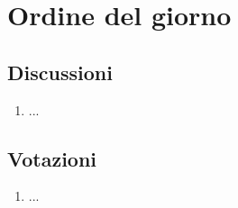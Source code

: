 \section{Ordine del giorno} \label{sec:agenda}
\subsection{Discussioni} \label{subsec:discussione}
\begin{enumerate}
    \item ... 
\end{enumerate}

\subsection{Votazioni} \label{subsec:votazione}
\begin{enumerate}
    \item ...
\end{enumerate}